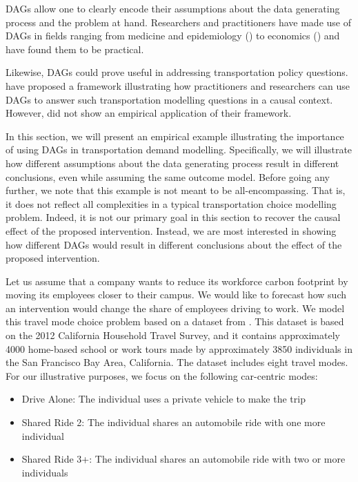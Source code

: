 DAGs allow one to clearly encode their assumptions about the data generating process and the problem at hand.
Researchers and practitioners have made use of DAGs in fields ranging from medicine and epidemiology (\citet{shrier_2008_reducing, sung_2012_reducing}) to economics (\citet{white_2011_covariate}) and have found them to be practical.

Likewise, DAGs could prove useful in addressing transportation policy questions.
\citet{brathwaite_2018_causal} have proposed a framework illustrating how practitioners and researchers can use DAGs to answer such transportation modelling questions in a causal context.
However, \citet{brathwaite_2018_causal} did not show an empirical application of their framework.

In this section, we will present an empirical example illustrating the importance of using DAGs in transportation demand modelling.
Specifically, we will illustrate how different assumptions about the data generating process result in different conclusions, even while assuming the same outcome model.
Before going any further, we note that this example is not meant to be all-encompassing.
That is, it does not reflect all complexities in a typical transportation choice modelling problem.
Indeed, it is not our primary goal in this section to recover the causal effect of the proposed intervention.
Instead, we are most interested in showing how different DAGs would result in different conclusions about the effect of the proposed intervention.

Let us assume that a company wants to reduce its workforce carbon footprint by moving its employees closer to their campus.
We would like to forecast how such an intervention would change the share of employees driving to work.
We model this travel mode choice problem based on a dataset from \citet{brathwaite_asymmetric}.
This dataset is based on the 2012 California Household Travel Survey, and it
contains approximately 4000 home-based school or work tours made by approximately 3850 individuals in the San Francisco Bay Area, California.
The dataset includes eight travel modes.
For our illustrative purposes, we focus on the following car-centric modes:

\begin{itemize}
   \item Drive Alone: The individual uses a private vehicle to make the trip
   \item Shared Ride 2: The individual shares an automobile ride with one more individual
   \item Shared Ride 3+: The individual shares an automobile ride with two or more individuals
\end{itemize}

